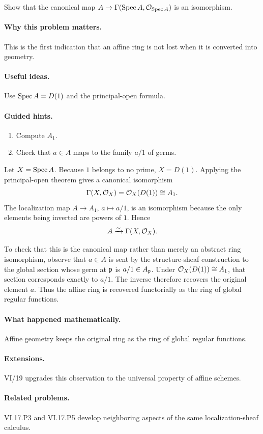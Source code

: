 \begin{problem}\label{prob:vi17-p04}
Show that the canonical map $A\to\Gamma(\operatorname{Spec} A,\mathcal O_{\operatorname{Spec} A})$ is an isomorphism.
\end{problem}

\ifdefined\FullProblemDossiers
\paragraph{Why this problem matters.}
This is the first indication that an affine ring is not lost when it is converted into geometry.

\paragraph{Useful ideas.}
Use $\operatorname{Spec} A=D(1)$ and the principal-open formula.

\paragraph{Guided hints.}
\begin{enumerate}
\item Compute $A_1$.
\item Check that $a\in A$ maps to the family $a/1$ of germs.
\end{enumerate}

\begin{solution}
Let $X=\operatorname{Spec} A$.  Because $1$ belongs to no prime, $X=D(1)$.  Applying the principal-open theorem gives a canonical isomorphism
\[
\Gamma(X,\mathcal O_X)=\mathcal O_X(D(1))\cong A_1.
\]
The localization map $A\to A_1$, $a\mapsto a/1$, is an isomorphism because the only elements being inverted are powers of $1$.  Hence
\[
A\xrightarrow{\sim}\Gamma(X,\mathcal O_X).
\]

To check that this is the canonical map rather than merely an abstract ring isomorphism, observe that $a\in A$ is sent by the structure-sheaf construction to the global section whose germ at $\mathfrak p$ is $a/1\in A_{\mathfrak p}$.  Under $\mathcal O_X(D(1))\cong A_1$, that section corresponds exactly to $a/1$.  The inverse therefore recovers the original element $a$.  Thus the affine ring is recovered functorially as the ring of global regular functions.
\end{solution}



\paragraph{What happened mathematically.}
Affine geometry keeps the original ring as the ring of global regular functions.

\paragraph{Extensions.}
VI/19 upgrades this observation to the universal property of affine schemes.

\paragraph{Related problems.}
VI.17.P3 and VI.17.P5 develop neighboring aspects of the same localization-sheaf calculus.
\fi
